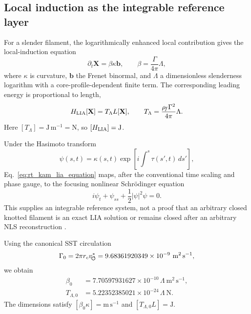 \subsection{Local induction as the integrable reference layer}
\label{subsec:rt_kam_lia_reference}

For a slender filament, the logarithmically enhanced local contribution gives
the local-induction equation
\begin{equation}
    \partial_t\mathbf X
    =
    \beta\kappa\mathbf b,
    \qquad
    \beta
    =
    \frac{\Gamma}{4\pi}\Lambda,
    \label{eq:rt_kam_lia_equation}
\end{equation}
where \(\kappa\) is curvature, \(\mathbf b\) the Frenet binormal, and
\(\Lambda\) a dimensionless slenderness logarithm with a core-profile-dependent
finite term.  The corresponding leading energy is proportional to length,
\begin{equation}
    H_{\rm LIA}[\mathbf X]
    =
    T_{\Lambda}L[\mathbf X],
    \qquad
    T_{\Lambda}
    =
    \frac{\rho_{\!f}\Gamma^2}{4\pi}\Lambda.
    \label{eq:rt_kam_lia_hamiltonian}
\end{equation}
Here \([T_{\Lambda}]=\mathrm{J\,m^{-1}}=\mathrm N\), so
\([H_{\rm LIA}]=\mathrm J\).

Under the Hasimoto transform
\begin{equation}
    \psi(s,t)
    =
    \kappa(s,t)
    \exp\!\left[
    i\int^s\tau(s',t)\,ds'
    \right],
    \label{eq:rt_kam_hasimoto_transform}
\end{equation}
Eq.~\eqref{eq:rt_kam_lia_equation} maps, after the conventional time scaling
and phase gauge, to the focusing nonlinear Schr\"odinger equation
\begin{equation}
    i\psi_t+\psi_{ss}+\frac12|\psi|^2\psi=0.
    \label{eq:rt_kam_focusing_nlse}
\end{equation}
This supplies an integrable reference system, not a proof that an arbitrary
closed knotted filament is an exact LIA solution or remains closed after an
arbitrary NLS reconstruction \cite{Hasimoto1972,JerrardSeis2017}.

Using the canonical SST circulation
\begin{equation}
    \Gamma_0
    =
    2\pi r_cv_{\!\boldsymbol{\circlearrowleft}}^{\ast}
    =
    9.68361920349\times10^{-9}\ \mathrm{m^2\,s^{-1}},
    \label{eq:rt_kam_gamma_numeric}
\end{equation}
we obtain
\begin{align}
    \beta_0
    &=
    7.70597931627\times10^{-10}\,\Lambda
    \ \mathrm{m^2\,s^{-1}},
    \label{eq:rt_kam_beta_numeric}
    \\
    T_{\Lambda,0}
    &=
    5.22352385021\times10^{-24}\,\Lambda
    \ \mathrm{N}.
    \label{eq:rt_kam_line_tension_numeric}
\end{align}
The dimensions satisfy
\([\beta_0\kappa]=\mathrm{m\,s^{-1}}\) and
\([T_{\Lambda,0}L]=\mathrm J\).

